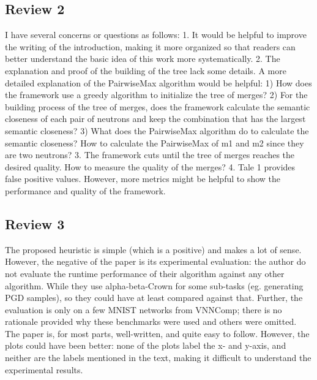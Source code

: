 
  \subsection{Review 2}
  
 I have several concerns or questions as follows:
  1. It would be helpful to improve the writing of the introduction,  making it
     more organized so that readers can better understand the  basic idea of
     this work more systematically.
  2. The explanation and proof of the building of the tree lack some  details. A
     more detailed explanation of the PairwiseMax algorithm  would be helpful:
 1) How does the framework use a greedy algorithm to initialize the  tree of
    merges?  2) For the building process of the tree of merges, does the
    framework  calculate the semantic closeness of each pair of neutrons and
    keep the  combination that has the largest semantic closeness?
 3) What does the PairwiseMax algorithm do to calculate the semantic  closeness?
    How to calculate the PairwiseMax of m1 and m2 since they  are two neutrons?
  3. The framework cuts until the tree of merges reaches the desired  quality.
     How to measure the quality of the merges?
  4. Tale 1 provides false positive values. However, more metrics might  be
     helpful to show the performance and quality of the framework.

\subsection{Review 3}
     
 The proposed heuristic is simple (which is a positive) and makes a lot  of
 sense. However, the negative of the paper is its experimental  evaluation: the
 author do not evaluate the runtime performance of  their algorithm against any
 other algorithm. While they use  alpha-beta-Crown for some sub-tasks (eg.
 generating PGD samples), so  they could have at least compared against that.
 Further, the  evaluation is only on a few MNIST networks from VNNComp; there is
 no  rationale provided why these benchmarks were used and others were  omitted.
 The paper is, for most parts, well-written, and quite easy to follow.  However,
 the plots could have been better: none of the plots label the  x- and y-axis,
 and neither are the labels mentioned in the text,  making it difficult to
 understand the experimental results. 

